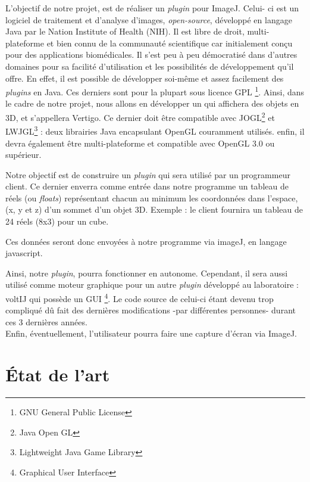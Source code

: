 \documentclass[11pt]{report}
\begin{document}
 L'objectif de notre projet, est de réaliser un \textit{plugin} pour ImageJ. Celui- ci est un logiciel de traitement et d’analyse d’images, \textit{open-source}, développé en langage Java\cite{java} par le Nation Institute of Health (NIH). 
Il est libre de droit, multi-plateforme et bien connu de la communauté scientifique car initialement conçu pour des applications biomédicales. Il s’est peu à peu démocratisé dans d’autres domaines pour sa facilité d’utilisation et les possibilités de développement qu’il offre. 
En effet, il est possible de développer soi-même et assez facilement des \textit{plugins} en Java. Ces derniers sont pour la plupart sous licence GPL \footnote{GNU General Public License}.
 Ainsi, dans le cadre de notre projet, nous allons en développer un qui affichera des objets en 3D, et s'appellera Vertigo. Ce dernier doit être compatible avec JOGL\footnote{Java Open GL} \cite{jogl} et LWJGL\footnote{Lightweight Java Game Library} \cite{lwjgl} : deux librairies Java encapsulant OpenGL couramment utilisés.
enfin, il devra également être multi-plateforme et compatible avec OpenGL 3.0 ou supérieur.



Notre objectif est de construire un \textit{plugin} qui sera utilisé par un programmeur client. Ce dernier enverra comme entrée dans notre programme un tableau de réels (ou \textit{floats}) représentant chacun au minimum les coordonnées dans l'espace, (x, y et z) d'un sommet d'un objet 3D. Exemple : le client fournira un tableau de 24 réels (8x3) pour un cube.

 Ces données seront donc envoyées à notre programme via imageJ, en langage javascript\cite{javascript}.
 
Ainsi, notre \textit{plugin}, pourra fonctionner en autonome. Cependant, il sera aussi utilisé comme moteur graphique pour un autre \textit{plugin} développé au laboratoire : voltIJ qui possède un GUI \footnote{Graphical User Interface}.
Le code source de celui-ci étant devenu trop compliqué dû fait des dernières modifications -par différentes personnes- durant ces 3 dernières années.
\\



Enfin, éventuellement, l'utilisateur pourra faire une capture d'écran via ImageJ.

\chapter{État de l'art}
\end{document}
